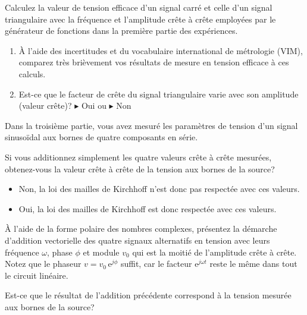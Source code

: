 \documentclass[canadien,12pt,oneside,letterpaper]{article}
\begin{document}
\begin{gradescope}
        \item Calculez la valeur de tension efficace d'un signal carré et celle d'un signal triangulaire avec la fréquence et l'amplitude crête à crête employées par le générateur de fonctions dans la première partie des expériences. 
    \begin{enumerate}
        \item À l'aide des incertitudes et du vocabulaire international de métrologie (VIM), comparez très brièvement vos résultats de mesure en tension efficace à ces calculs. %
        \item Est-ce que le facteur de crête du signal triangulaire varie avec son amplitude (valeur crête)? $\blacktriangleright$ Oui ou $\blacktriangleright$ Non
    \end{enumerate}
    \item Dans la troisième partie, vous avez mesuré les paramètres de tension d'un signal sinusoïdal aux bornes de quatre composants en série.
    \begin{gradescope}
        \item Si vous additionnez simplement les quatre valeurs crête à crête mesurées, obtenez-vous la valeur crête à crête de la tension aux bornes de la source? 
        \begin{itemize}[label=$\blacktriangleright$]
            \item Non, la loi des mailles de Kirchhoff n'est donc pas respectée avec ces valeurs.
            \item Oui, la loi des mailles de Kirchhoff est donc respectée avec ces valeurs.
        \end{itemize}
        \item À l'aide de la forme polaire des nombres complexes, présentez la démarche d'addition vectorielle des quatre signaux alternatifs en tension avec leurs fréquence $\omega$, phase $\phi$ et module $v_0$ qui est la moitié de l'amplitude crête à crête. Notez que le phaseur $v=v_0\,\textrm{e}^{j\phi}$ suffit, car le facteur $\textrm{e}^{j\omega t}$ reste le même dans tout le circuit linéaire.
        \item Est-ce que le résultat de l'addition précédente   correspond à la tension mesurée aux bornes de la source?
        \begin{itemize}[label=$\blacktriangleright$]

\end{itemize}
\end{gradescope}
\end{gradescope}
\end{document}
